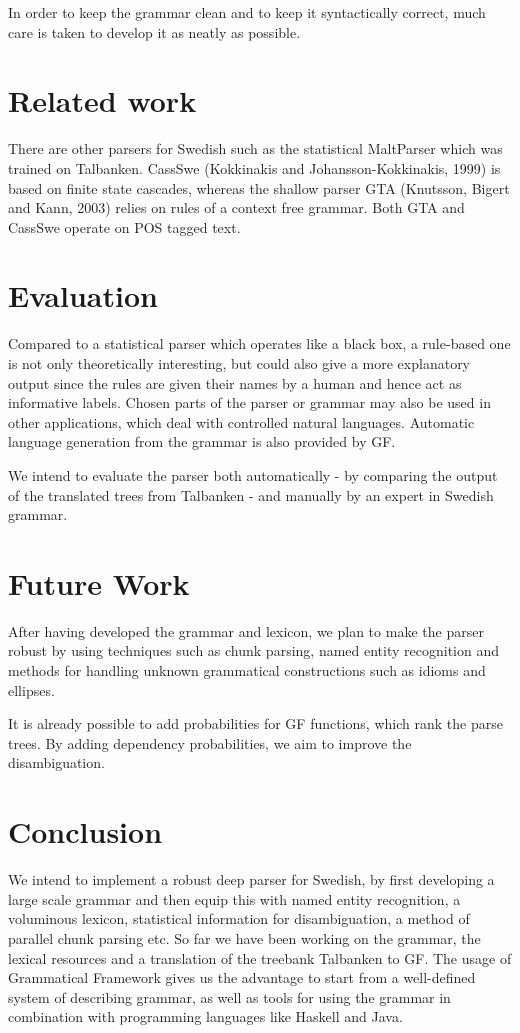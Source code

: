 \documentclass[submission]{eptcs} %
\begin{document}
In order to keep the grammar clean and to keep it syntactically correct,
much care is taken to develop it as neatly as possible. 

\section{Related work}
There are other parsers for Swedish such as the statistical MaltParser\cite{malt}
which was trained on Talbanken. 
CassSwe (Kokkinakis and Johansson-Kokkinakis, 1999) is based on finite state cascades,
whereas the shallow parser GTA (Knutsson, Bigert and Kann, 2003) relies on rules of 
a context free grammar. Both GTA and CassSwe operate on POS tagged text.


\section{Evaluation}
Compared to a statistical parser which operates like a black box,
a rule-based one is not only theoretically interesting,
but could also give a more explanatory output since the rules
are given their names by a human and hence act as informative labels.
Chosen parts of the parser or grammar may also be used in other applications,
which deal with controlled natural languages. Automatic language
generation from the grammar is also provided by GF.

We intend to evaluate the parser both automatically - by comparing the output of
the translated trees from Talbanken - and manually by an expert in Swedish grammar.

\section{Future Work}

After having developed the grammar and lexicon, we plan to 
make the parser robust by using techniques such as chunk parsing, named
entity recognition and methods for handling unknown 
grammatical constructions such as idioms and ellipses. %

It is already possible to add probabilities for GF functions,
which rank the parse trees.
By adding dependency probabilities, we aim to improve the
disambiguation.


\section{Conclusion}
We intend to implement a robust deep parser for Swedish, by first developing
a large scale grammar and then equip this with named entity recognition, a
voluminous lexicon, statistical information for disambiguation,
a method of parallel chunk parsing etc.
So far we have been working on the grammar, the lexical resources and
a translation of the treebank Talbanken to GF.
The usage of Grammatical Framework gives us the advantage to start from
a well-defined system of describing grammar, as well as tools for
using the grammar in combination with programming languages like Haskell
and Java. 
\end{document}
